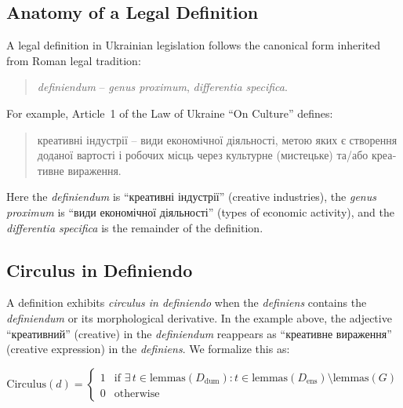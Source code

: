 \documentclass[11pt]{article}
\begin{document}
\subsection{Anatomy of a Legal Definition}
\label{sec:anatomy}

A legal definition in Ukrainian legislation follows the canonical form inherited from Roman legal tradition:

\begin{quote}
\emph{definiendum} -- \emph{genus proximum}, \emph{differentia specifica}.
\end{quote}

\noindent For example, Article~1 of the Law of Ukraine ``On Culture'' defines:

\begin{quote}
\foreignlanguage{ukrainian}{креативні індустрії -- види економічної діяльності, метою яких є створення доданої вартості і робочих місць через культурне (мистецьке) та/або креативне вираження.}
\end{quote}

\noindent Here the \emph{definiendum} is \foreignlanguage{ukrainian}{``креативні індустрії''} (creative industries), the \emph{genus proximum} is \foreignlanguage{ukrainian}{``види економічної діяльності''} (types of economic activity), and the \emph{differentia specifica} is the remainder of the definition.

\subsection{Circulus in Definiendo}
\label{sec:circulus-def}

A definition exhibits \emph{circulus in definiendo} when the \emph{definiens} contains the \emph{definiendum} or its morphological derivative.
In the example above, the adjective \foreignlanguage{ukrainian}{``креативний''} (creative) in the \emph{definiendum} reappears as \foreignlanguage{ukrainian}{``креативне вираження''} (creative expression) in the \emph{definiens}.
We formalize this as:

\begin{equation}
\label{eq:circulus}
\text{Circulus}(d) = \begin{cases}
1 & \text{if } \exists\, t \in \text{lemmas}(D_{\text{dum}}) : t \in \text{lemmas}(D_{\text{ens}}) \setminus \text{lemmas}(G) \\
0 & \text{otherwise}
\end{cases}
\end{equation}
\end{document}
